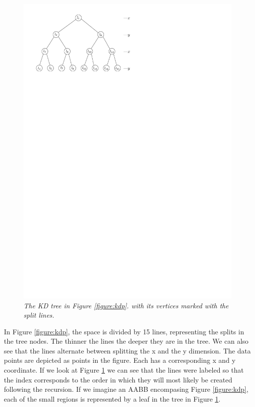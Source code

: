 \documentclass[12pt]{article}
\begin{document}
\begin{figure}
\centering
\includegraphics{figs/kdTree_updated}
\caption{\textit{The KD tree in Figure \ref{figure:kdp}. with its vertices marked with the split lines.}}
\label{figure:kdt}
\end{figure}
In Figure \ref{figure:kdp}, the space is divided by 15 lines, representing the splits in the tree nodes. The thinner the lines the deeper they are in the tree. We can also see that the lines alternate between splitting the x and the y dimension. The data points are depicted as points in the figure. Each has a corresponding x and y coordinate. If we look at Figure \ref{figure:kdt} we can see that the lines were labeled so that the index corresponds to the order in which they will most likely be created following the recursion. If we imagine an AABB encompasing Figure \ref{figure:kdp}, each of the small regions is represented by a leaf in the tree in Figure \ref{figure:kdt}.
\end{document}

